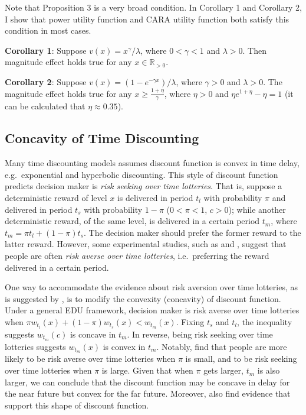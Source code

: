 \documentclass[
  12pt,
]{article}
\begin{document}
Note that Proposition 3 is a very broad condition. In Corollary 1 and
Corollary 2, I show that power utility function and CARA utility
function both satisfy this condition in most cases.

\textbf{Corollary 1}: Suppose \(v(x)=x^\gamma/\lambda\), where
\(0<\gamma<1\) and \(\lambda>0\). Then magnitude effect holds true for
any \(x\in \mathbb{R}_{>0}\).

\textbf{Corollary 2}: Suppose \(v(x)=(1-e^{-\gamma x})/\lambda\), where
\(\gamma>0\) and \(\lambda>0\). The magnitude effect holds true for any
\(x\geq \frac{1+\eta}{\gamma}\), where \(\eta>0\) and
\(\eta e^{1+\eta}-\eta=1\) (it can be calculated that
\(\eta \approx 0.35\)).

\hypertarget{concavity-of-time-discounting}{%
\subsection{Concavity of Time
Discounting}\label{concavity-of-time-discounting}}

Many time discounting models assumes discount function is convex in time
delay, e.g.~exponential and hyperbolic discounting. This style of
discount function predicts decision maker is \emph{risk seeking over
time lotteries}. That is, suppose a deterministic reward of level \(x\)
is delivered in period \(t_l\) with probability \(\pi\) and delivered in
period \(t_s\) with probability \(1-\pi\) (\(0<\pi<1\), \(c>0\)); while
another deterministic reward, of the same level, is delivered in a
certain period \(t_m\), where \(t_m=\pi t_l +(1-\pi) t_s\). The decision
maker should prefer the former reward to the latter reward. However,
some experimental studies, such as \citet{onay_intertemporal_2007} and
\citet{dejarnette_time_2020}, suggest that people are often \emph{risk
averse over time lotteries}, i.e.~preferring the reward delivered in a
certain period.

One way to accommodate the evidence about risk aversion over time
lotteries, as is suggested by \citet{dejarnette_time_2020}, is to modify
the convexity (concavity) of discount function. Under a general EDU
framework, decision maker is risk averse over time lotteries when
\(\pi w_{t_l}(x)+(1-\pi)w_{t_s}(x)<w_{t_m}(x)\). Fixing \(t_s\) and
\(t_l\), the inequality suggests \(w_{t_m}(c)\) is concave in \(t_m\).
In reverse, being risk seeking over time lotteries suggests
\(w_{t_m}(x)\) is convex in \(t_m\). Notably,
\citet{onay_intertemporal_2007} find that people are more likely to be
risk averse over time lotteries when \(\pi\) is small, and to be risk
seeking over time lotteries when \(\pi\) is large. Given that when
\(\pi\) gets larger, \(t_m\) is also larger, we can conclude that the
discount function may be concave in delay for the near future but convex
for the far future. Moreover, \citet{takeuchi_non-parametric_2011} also
find evidence that support this shape of discount function.
\end{document}
